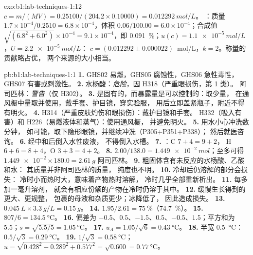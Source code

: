 \begin{solution}{exo:b1:lab-techniques-1:12}
$c = m/(MV) = 0.25100/(204.2 \times 0.10000) = \qty{0.012292}{mol/L}$。
：质量 $1.7 \times 10^{-4}/0.2510 = 6.8 \times
10^{-4}$，体积 $0.06/100.00 = 6.0 \times 10^{-4}$；合成值
$\sqrt{(6.8^2 + 6.0^2)} \times 10^{-4} = 9.1 \times 10^{-4}$，即
\qty{0.091}{\percent}；$u(c) = \qty{1.1e-5}{mol/L}$，$U = \qty{2.2e-5}{mol/L}$：
$c = (0.012292 \pm 0.000022)$~mol/L，$k = 2$。称量的贡献略占优，
两个来源的大小相当。
\end{solution}

\begin{solution}{pb:b1:lab-techniques-1:1}
\textbf{1.} GHS02 易燃，GHS05 腐蚀性，GHS06 急性毒性，GHS07
有害或刺激性。
\textbf{2.} 水杨酸：\emph{危险}，因 H318（严重眼损伤，第 1 类）。
阿司匹林：\emph{警告}（仅 H302）。
\textbf{3.} 是固有的，而暴露量是可以控制的：取少量，
在通风橱中量取并使用，戴手套、护目镜，穿实验服，
用后立即盖紧瓶子，附近不得有明火。
\textbf{4.} H314（严重皮肤灼伤和眼损伤）：戴护目镜和手套。
H332（吸入有害）和 H226（易燃液体和蒸气）：使用通风橱，
并避免明火。
\textbf{5.} 用水小心冲洗数分钟，
如可能，取下隐形眼镜，并继续冲洗（P305+P351+P338）；
然后就医咨询。
\textbf{6.} 经中和后倒入水性废液，
不得倒入水槽。
\textbf{7.} ：C $7 + 4 = 9 + 2$，
H $6 + 6 = 8 + 4$，O $3 + 3 = 4 + 2$。
\textbf{8.} $2.00/138.0 = \qty{1.449e-2}{mol}$；至多可得
$\num{1.449e-2} \times 180.0 = \qty{2.61}{g}$ 阿司匹林。
\textbf{9.} 粗固体含有未反应的水杨酸、乙酸和水：
其质量并非阿司匹林的质量，
纯度也不明。
\textbf{10.} 冷却后仍溶解的部分会损失：
冷时小而热时大，意味着产物热时溶解，
冷时几乎全部重新析出。
\textbf{11.} 每多加一毫升溶剂，
就会有相应份额的产物在冷时仍溶于其中。
\textbf{12.} 缓慢生长得到的更大、更规整，
包裹的母液和杂质更少；冰降低了，
因此造成损失。
\textbf{13.} $\qty{0.045}{L} \times \qty{3.3}{g/L} = \qty{0.15}{g}$。
\textbf{14.} $1.95/2.61 = \qty{75}{\percent}$（\qty{74.7}{\percent}）。
\textbf{15.} $807/6 = \qty{134.5}{\celsius}$。
\textbf{16.} 偏差为 $-0.5$、$0.5$、$-1.5$、$0.5$、$-0.5$、$1.5$；平方和为
5.5；$s = \sqrt{5.5/5} = \qty{1.05}{\celsius}$。
\textbf{17.} $u_A = 1.05/\sqrt6 = \qty{0.43}{\celsius}$。
\textbf{18.} 半宽 \qty{0.5}{\celsius}：$0.5/\sqrt3 = \qty{0.29}{\celsius}$。
\textbf{19.} $1/\sqrt3 = \qty{0.58}{\celsius}$；
$u = \sqrt{0.428^2 + 0.289^2 + 0.577^2} = \sqrt{0.600} = \qty{0.77}{\celsius}$。

\end{solution}
